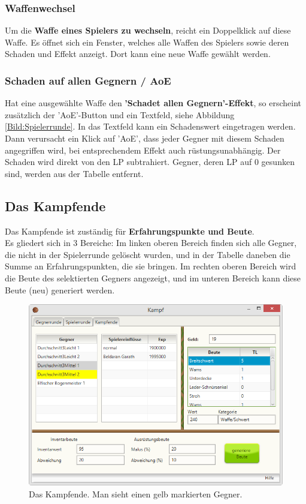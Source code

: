\documentclass[11pt, a4paper, german]{article}
\begin{document}
\subsubsection{Waffenwechsel}
Um die \textbf{Waffe eines Spielers zu wechseln}, reicht ein Doppelklick auf diese Waffe. Es öffnet sich ein Fenster, welches alle Waffen des Spielers sowie deren Schaden und Effekt anzeigt. Dort kann eine neue Waffe gewählt werden.

\subsubsection{Schaden auf allen Gegnern / AoE}\label{Abschnitt:aoe}
Hat eine ausgewählte Waffe den \textbf{'Schadet allen Gegnern'-Effekt}, so erscheint zusätzlich der 'AoE'-Button und ein Textfeld, siehe Abbildung \ref{Bild:Spielerrunde}. In das Textfeld kann ein Schadenswert eingetragen werden. Dann verursacht ein Klick auf 'AoE', dass jeder Gegner mit diesem Schaden angegriffen wird, bei entsprechendem Effekt auch rüstungsunabhängig. Der Schaden wird direkt von den LP subtrahiert. Gegner, deren LP auf 0 gesunken sind, werden aus der Tabelle entfernt.

\subsection{Das Kampfende}\label{Abschnitt:Kampfende}
Das Kampfende ist zuständig für \textbf{Erfahrungspunkte und Beute}.\\
Es gliedert sich in 3 Bereiche: Im linken oberen Bereich finden sich alle Gegner, die nicht in der Spielerrunde gelöscht wurden, und in der Tabelle daneben die Summe an Erfahrungspunkten, die sie bringen. Im rechten oberen Bereich wird die Beute des selektierten Gegners angezeigt, und im unteren Bereich kann diese Beute (neu) generiert werden.\\
\begin{figure}
\centering
\includegraphics[width=\linewidth]{Bilder/Kampfende.png}
\caption{Das Kampfende. Man sieht einen gelb markierten Gegner.}
\label{Bild:Kampfende}
\end{figure}
\end{document}
